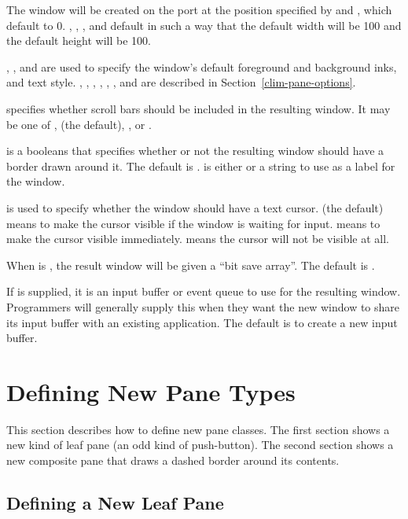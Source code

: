 The window will be created on the port  at the position specified by
 and , which default to 0.  , ,
, and  default in such a way that the default width will
be 100 and the default height will be 100.

, , and  are used to specify the
window's default foreground and background inks, and text style.
, , ,
, , , and  are
described in Section~\ref{clim-pane-options}.

 specifies whether scroll bars should be included in the
resulting window.  It may be one of ,  (the default),
, or .

 is a booleans that specifies whether or not the resulting window
should have a border drawn around it.  The default is .   is
either  or a string to use as a label for the window.

 is used to specify whether the window should
have a text cursor.   (the default) means to make the cursor visible if
the window is waiting for input.   means to make the cursor visible
immediately.   means the cursor will not be visible at all.

When  is , the result window will be given a ``bit
save array''.  The default is .

If  is supplied, it is an input buffer or event queue to use
for the resulting window.  Programmers will generally supply this when they want
the new window to share its input buffer with an existing application.  The
default is to create a new input buffer.


\section {Defining New Pane Types}

This section describes how to define new pane classes.  The first section shows
a new kind of leaf pane (an odd kind of push-button).  The second section shows
a new composite pane that draws a dashed border around its contents.

\subsection {Defining a New Leaf Pane}

